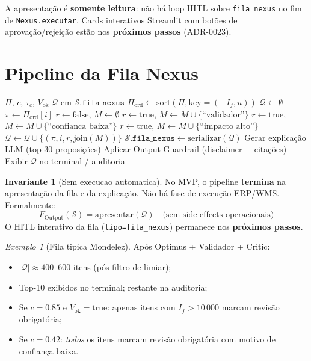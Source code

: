 \documentclass[a4paper, 12pt]{report}
\theoremstyle{definition}
\newtheorem{invariante}{Invariante}[chapter]
\theoremstyle{remark}
\newtheorem{exemplo}{Exemplo}[chapter]
\newcommand{\state}{\mathcal{S}}
\newcommand{\fila}{\mathcal{Q}}
\begin{document}
A apresenta\c{c}\~ao \'e \textbf{somente leitura}: n\~ao h\'a loop HITL
sobre \texttt{fila\_nexus} no fim de \texttt{Nexus.executar}.
Cards interativos Streamlit com bot\~oes de aprova\c{c}\~ao/rejei\c{c}\~ao
est\~ao nos \textbf{pr\'oximos passos} (ADR-0023).


\section{Pipeline da Fila Nexus}

\begin{algorithm}[H]
\caption{Fila Nexus -- Montagem e HITL}
\begin{algorithmic}[1]
  \Require $\Pi$, $c$, $\tau_c$, $V_{\text{ok}}$
  \Ensure $\fila$ em $\state.\texttt{fila\_nexus}$
  \State $\Pi_{\text{ord}} \gets \text{sort}(\Pi, \text{key}=(-I_f, u))$
  \State $\fila \gets \emptyset$
    \State $\pi \gets \Pi_{\text{ord}}[i]$
    \State $r \gets \text{false}$, $M \gets \emptyset$
      \State $r \gets \text{true}$, $M \gets M \cup \{\text{``validador''}\}$
    \EndIf
      \State $r \gets \text{true}$, $M \gets M \cup \{\text{``confianca baixa''}\}$
    \EndIf
      \State $r \gets \text{true}$, $M \gets M \cup \{\text{``impacto alto''}\}$
    \EndIf
    \State $\fila \gets \fila \cup \{(\pi, i, r, \text{join}(M))\}$
  \EndFor
  \State $\state.\texttt{fila\_nexus} \gets \text{serializar}(\fila)$
  \State Gerar explica\c{c}\~ao LLM (top-30 proposi\c{c}\~oes)
  \State Aplicar Output Guardrail (disclaimer + cita\c{c}\~oes)
  \State Exibir $\fila$ no terminal / auditoria
\end{algorithmic}
\end{algorithm}

\begin{invariante}[{Sem execucao automatica}]
  No MVP, o pipeline \textbf{termina} na apresenta\c{c}\~ao da fila
  e da explica\c{c}\~ao. N\~ao h\'a fase de execu\c{c}\~ao ERP/WMS.
  Formalmente:
  \[
    F_{\text{Output}}(\state) = \text{apresentar}(\fila)
    \quad \text{(sem side-effects operacionais)}
  \]
  O HITL interativo da fila (\texttt{tipo=fila\_nexus}) permanece
  nos \textbf{pr\'oximos passos}.
\end{invariante}

\begin{exemplo}[Fila tipica Mondelez]
  Ap\'os Optimus + Validador + Critic:
  \begin{itemize}
    \item $|\fila| \approx 400$--$600$ itens (p\'os-filtro de limiar);
    \item Top-10 exibidos no terminal; restante na auditoria;
    \item Se $c = 0.85$ e $V_{\text{ok}} = \text{true}$: apenas itens com
      $I_f > 10\,000$ marcam revis\~ao obrigat\'oria;
    \item Se $c = 0.42$: \textit{todos} os itens marcam revis\~ao
      obrigat\'oria com motivo de confian\c{c}a baixa.
  \end{itemize}
\end{exemplo}
\end{document}
